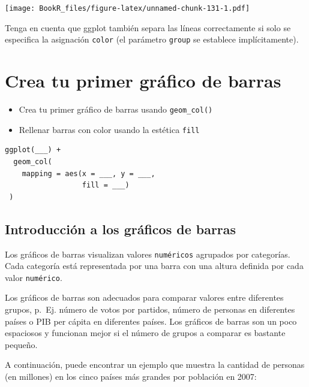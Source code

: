 \documentclass[
]{book}
\providecommand{\tightlist}{%
  \setlength{\itemsep}{0pt}\setlength{\parskip}{0pt}}
\begin{document}
\texttt{[image: BookR\_files/figure-latex/unnamed-chunk-131-1.pdf]}

Tenga en cuenta que ggplot también separa las líneas correctamente si solo se especifica la asignación \texttt{color} (el parámetro \texttt{group} se establece implícitamente).

\hypertarget{crea-tu-primer-gruxe1fico-de-barras}{%
\section{Crea tu primer gráfico de barras}\label{crea-tu-primer-gruxe1fico-de-barras}}

\begin{itemize}
\tightlist
\item
  Crea tu primer gráfico de barras usando \texttt{geom\_col()}
\item
  Rellenar barras con color usando la estética \texttt{fill}
\end{itemize}

\begin{verbatim}
ggplot(___) + 
  geom_col(
    mapping = aes(x = ___, y = ___, 
                  fill = ___)
 )
\end{verbatim}

\hypertarget{introducciuxf3n-a-los-gruxe1ficos-de-barras}{%
\subsection{Introducción a los gráficos de barras}\label{introducciuxf3n-a-los-gruxe1ficos-de-barras}}

Los gráficos de barras visualizan valores \texttt{numéricos} agrupados por categorías. Cada categoría está representada por una barra con una altura definida por cada valor \texttt{numérico}.

Los gráficos de barras son adecuados para comparar valores entre diferentes grupos, p.~Ej. número de votos por partidos, número de personas en diferentes países o PIB per cápita en diferentes países. Los gráficos de barras son un poco espaciosos y funcionan mejor si el número de grupos a comparar es bastante pequeño.

A continuación, puede encontrar un ejemplo que muestra la cantidad de personas (en millones) en los cinco países más grandes por población en 2007:
\end{document}

